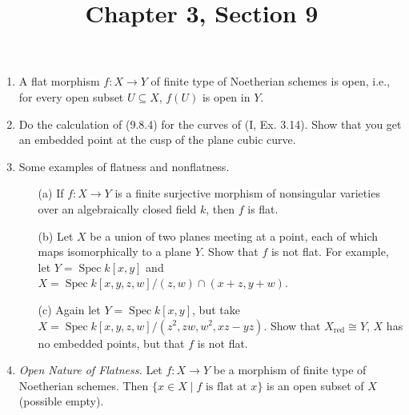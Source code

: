 \documentclass{article}
\title{Chapter 3, Section 9}
\DeclareMathOperator{\spec}{Spec}
\begin{document}
\maketitle
\begin{enumerate} [label=\textbf{\arabic*.}, leftmargin=0em]

\item A flat morphism $f : X \to Y$ of finite type of Noetherian schemes is open, i.e., for every open subset $U \subseteq X$, $f(U)$ is open in $Y$.

\item Do the calculation of (9.8.4) for the curves of (I, Ex. 3.14). Show that you get an embedded point at the cusp of the plane cubic curve.

\item Some examples of flatness and nonflatness.
\begin{itemize}
  \item[(a)] If $f : X \to Y$ is a finite surjective morphism of nonsingular varieties over an algebraically closed field $k$, then $f$ is flat.
  \item[(b)] Let $X$ be a union of two planes meeting at a point, each of which maps isomorphically to a plane $Y$. Show that $f$ is not flat. For example, let $Y = \spec{k[x, y]}$ and $X = \spec{k[x, y, z, w]} / (z, w) \cap (x + z, y + w)$.
  \item[(c)] Again let $Y = \spec{k[x, y]}$, but take $X = \spec{k[x, y, z, w] / (z^2, zw, w^2, xz - yz)}$. Show that $X_\text{red} \cong Y$, $X$ has no embedded points, but that $f$ is not flat.
\end{itemize}

\item \textit{Open Nature of Flatness.} Let $f : X \to Y$ be a morphism of finite type of Noetherian schemes. Then $\{ x \in X \mid \text{$f$ is flat at $x$} \}$ is an open subset of $X$ (possible empty).


\end{enumerate}
\end{document}
